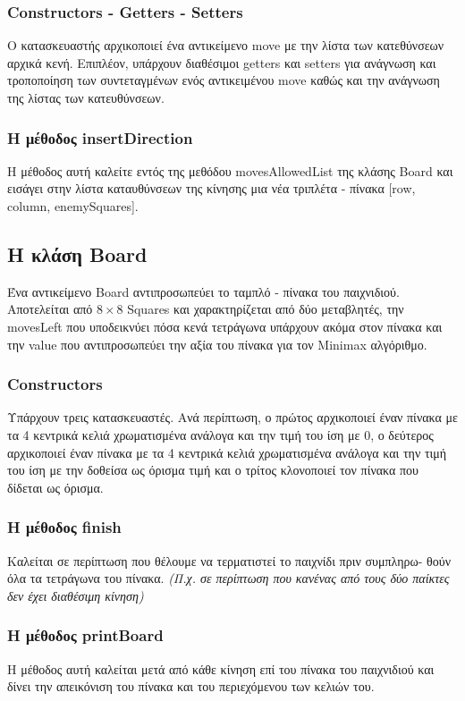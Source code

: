 \documentclass[12pt]{article}
\begin{document}
        \subsubsection{Constructors - Getters - Setters}
        Ο κατασκευαστής αρχικοποιεί ένα αντικείμενο move με την λίστα των κατεθύνσεων αρχικά κενή. Επιπλέον, υπάρχουν διαθέσιμοι getters και setters για ανάγνωση και τροποποίηση των συντεταγμένων ενός αντικειμένου move καθώς και την ανάγνωση της λίστας των κατευθύνσεων.
        \subsubsection{Η μέθοδος insertDirection}
        Η μέθοδος αυτή καλείτε εντός της μεθόδου movesAllowedList της κλάσης Board και εισάγει στην λίστα καταυθύνσεων της κίνησης μια νέα τριπλέτα - πίνακα [row, column, enemySquares].
    \subsection{Η κλάση Board}
    Ένα αντικείμενο Board αντιπροσωπεύει το ταμπλό - πίνακα του παιχνιδιού. Αποτελείται από $8\times8$ Squares και χαρακτηρίζεται από δύο μεταβλητές, την movesLeft που υποδεικνύει πόσα κενά τετράγωνα υπάρχουν ακόμα στον πίνακα και την value που αντιπροσωπεύει την αξία του πίνακα για τον Minimax αλγόριθμο. 
        \subsubsection{Constructors}
        Υπάρχουν τρεις κατασκευαστές. Ανά περίπτωση, ο πρώτος αρχικοποιεί έναν πίνακα με τα 4 κεντρικά κελιά χρωματισμένα ανάλογα και την τιμή του ίση με 0, ο δεύτερος αρχικοποιεί έναν πίνακα με τα 4 κεντρικά κελιά χρωματισμένα ανάλογα και την τιμή του ίση με την δοθείσα ως όρισμα τιμή και ο τρίτος κλονοποιεί τον πίνακα που δίδεται ως όρισμα. 
        \subsubsection{Η μέθοδος finish}
        Καλείται σε περίπτωση που θέλουμε να τερματιστεί το παιχνίδι πριν συμπληρω-
        θούν όλα τα τετράγωνα του πίνακα. \textit{(Π.χ. σε περίπτωση που κανένας από τους δύο παίκτες δεν έχει διαθέσιμη κίνηση)}
        \subsubsection{Η μέθοδος printBoard}
        Η μέθοδος αυτή καλείται μετά από κάθε κίνηση επί του πίνακα του παιχνιδιού και δίνει την απεικόνιση του πίνακα και του περιεχόμενου των κελιών του.
\end{document}
